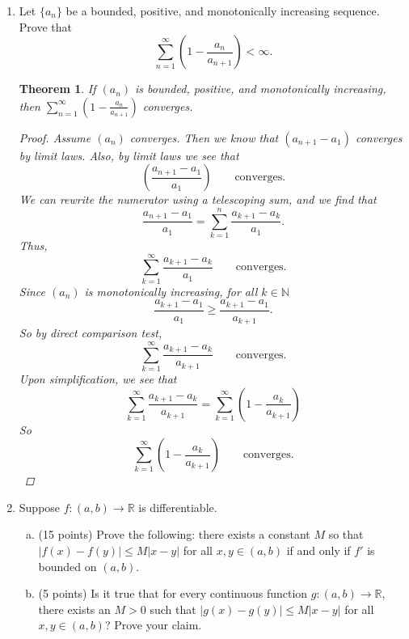 \documentclass{amsart}
\newtheorem{theorem}{Theorem}
\begin{document}
\begin{enumerate}[1.]
    \newpage
    \item Let $\{a_n\}$ be a bounded, positive, and monotonically increasing sequence. Prove that
    \[ \sum_{n=1}^{\infty} \left( 1- \frac{a_n}{a_{n+1}} \right) < \infty.\]
    \begin{theorem}
        If $(a_n)$ is bounded, positive, and monotonically increasing, then $\displaystyle \sum_{n = 1}^\infty \left( 1 - \frac{a_n}{a_{n+1}} \right)$ converges.
        \begin{proof}
            Assume $(a_n)$ converges. Then we know that $(a_{n+1} - a_1)$ converges by limit laws. Also, by limit laws we see that 
            \[
                \left( \frac{a_{n+1} - a_1}{a_1} \right) \qquad \text{converges}.    
            \]
            We can rewrite the numerator using a telescoping sum, and we find that
            \[
                \frac{a_{n+1} - a_1}{a_1} = \sum_{k = 1}^n \frac{a_{k + 1} - a_{k}}{a_1}.
            \]
            Thus, 
            \[
                \sum_{k = 1}^\infty \frac{a_{k + 1} - a_{k}}{a_1} \qquad \text{converges.}
            \]
            Since $(a_n)$ is monotonically increasing, for all $k \in \mathbb{N}$
            \[
                \frac{a_{k+1} - a_1}{a_1} \geq \frac{a_{k+1} - a_1}{a_{k+1}}.
            \]
            So by direct comparison test,
            \[
                \sum_{k = 1}^\infty \frac{a_{k + 1} - a_{k}}{a_{k+1}} \qquad \text{converges.}
            \]
            Upon simplification, we see that
            \[
                \sum_{k = 1}^\infty \frac{a_{k + 1} - a_{k}}{a_{k+1}} = \sum_{k = 1}^\infty \left( 1 - \frac{a_k}{a_{k+1}} \right)
            \]
            So 
            \[
                \sum_{k = 1}^\infty \left( 1 - \frac{a_k}{a_{k+1}} \right) \qquad \text{converges.}
            \]
        \end{proof}
    \end{theorem}
    
    \newpage
    \item Suppose $f: (a,b) \to \mathbb{R}$ is differentiable.
    \begin{enumerate}[(a)]
    \item (15 points) Prove the following: there exists a constant $M$ so that $|f(x) - f(y)| \leq M |x-y|$ for all $x,y \in (a,b)$ if and only if $f'$ is bounded on $(a,b)$.
    \item (5 points) Is it true that for every continuous function $g: (a,b) \to \mathbb{R}$, there exists an $M > 0$ such that $|g(x)-g(y)| \leq M |x-y|$ for all $x,y \in (a,b)$? Prove your claim.
    \end{enumerate}
    
    \end{enumerate}
    
\end{document}
